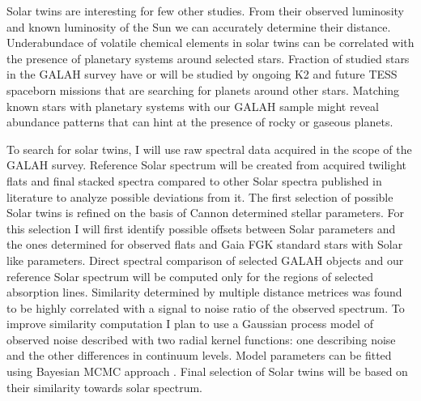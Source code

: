 Solar twins are interesting for few other studies. From their observed luminosity and known luminosity of the Sun we can accurately determine their distance. Underabundace of volatile chemical elements in solar twins can be correlated with the presence of planetary systems around selected stars. Fraction of studied stars in the GALAH survey have or will be studied by ongoing K2 \cite{2014PASP..126..398H} and future TESS \cite{2014SPIE.9143E..20R} spaceborn missions that are searching for planets around other stars. Matching known stars with planetary systems with our GALAH sample might reveal abundance patterns that can hint at the presence of rocky or gaseous planets.

To search for solar twins, I will use raw spectral data acquired in the scope of the GALAH survey. Reference Solar spectrum will be created from acquired twilight flats and final stacked spectra compared to other Solar spectra published in literature to analyze possible deviations from it. The first selection of possible Solar twins is refined on the basis of Cannon \cite{2015ApJ...808...16N} determined stellar parameters. For this selection I will first identify possible offsets between Solar parameters and the ones determined for observed flats and Gaia FGK standard stars \cite{2014A&A...564A.133J, 2015A&A...582A..49H} with Solar like parameters. Direct spectral comparison of selected GALAH objects and our reference Solar spectrum will be computed only for the regions of selected absorption lines. Similarity determined by multiple distance metrices was found to be highly correlated with a signal to noise ratio of the observed spectrum. To improve similarity computation I plan to use a Gaussian process \cite{2006gpml.book.....R} model of observed noise described with two radial kernel functions: one describing noise and the other differences in continuum levels. Model parameters can be fitted using Bayesian MCMC approach \cite{2013PASP..125..306F}. Final selection of Solar twins will be based on their similarity towards solar spectrum.